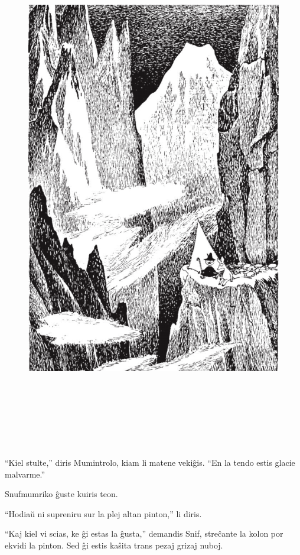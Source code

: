 \begin{figure}[htbp]
\centering
\includegraphics[width=450pt,height=655pt]{4-1.png}
\caption{}
\label{4-1}
\end{figure}

``Kiel stulte,'' diris Mumintrolo, kiam li matene vekiĝis. ``En la tendo estis glacie malvarme.''

Snufmumriko ĝuste kuiris teon.

``Hodiaŭ ni supreniru sur la plej altan pinton,'' li diris.

``Kaj kiel vi scias, ke ĝi estas la ĝusta,'' demandis Snif, streĉante la kolon por ekvidi la pinton. Sed ĝi estis kaŝita trans pezaj grizaj nuboj.

